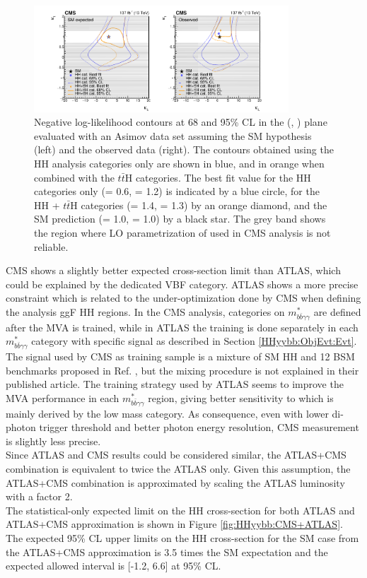 \begin{figure}[htbp]
    \centering
    \includegraphics[width=0.85\textwidth]{Ch5/Img/CMS-HIG-19-018_kl_LH.pdf}
    \caption{Negative log-likelihood contours at 68 and 95\% CL in the (\kl, \kt) plane evaluated with an Asimov data set assuming the SM hypothesis (left) and the observed data (right). The contours obtained using the HH analysis categories only are shown in blue, and in orange when combined with the $t\bar{t}$H categories. The best fit value for the HH categories only (\kl = 0.6, \kt = 1.2) is indicated by a blue circle, for the HH + $t\bar{t}$H categories (\kl = 1.4, \kl = 1.3) by an orange diamond, and the SM prediction (\kl = 1.0, \kt = 1.0) by a black star. The grey band shows the region where LO parametrization of \kt used in CMS analysis is not reliable. }
    \label{fig:HHyybb:CMS:LH:2D}
\end{figure}


CMS shows a slightly better expected cross-section limit than ATLAS, which could be explained by the dedicated VBF category. ATLAS shows a more precise \kl constraint which is related to the under-optimization done by CMS when defining the analysis ggF HH regions. In the CMS analysis, categories on $m_{b \bar{b} \gamma \gamma}^{*}$ are defined after the MVA is trained, while in ATLAS the training is done separately in each $m_{b \bar{b} \gamma \gamma}^{*}$ category with specific signal as described in Section \ref{HHyybb:ObjEvt:Evt}. The signal used by CMS as training sample is a mixture of SM HH and 12 BSM benchmarks proposed in Ref. \cite{CMS_BSM}, but the mixing procedure is not explained in their published article. The training strategy used by ATLAS seems to improve the MVA performance in each $m_{b \bar{b} \gamma \gamma}^{*}$ region, giving better sensitivity to \kl which is mainly derived by the low mass category. As consequence, even with lower di-photon trigger threshold and better photon energy resolution, CMS measurement is slightly less precise. \\

Since ATLAS and CMS results could be considered similar, the ATLAS+CMS \HHyybb combination is equivalent to twice the ATLAS only. Given this assumption, the ATLAS+CMS combination is approximated by scaling the ATLAS \HHyybb luminosity with a factor 2. \\
The statistical-only expected limit on the HH cross-section for both ATLAS and ATLAS+CMS approximation is shown in Figure \ref{fig:HHyybb:CMS+ATLAS}. The expected 95\% CL upper limits on the HH cross-section for the SM case from the ATLAS+CMS approximation is 3.5 times the SM expectation and the expected allowed \kl interval is [-1.2, 6.6] at 95\% CL. 

